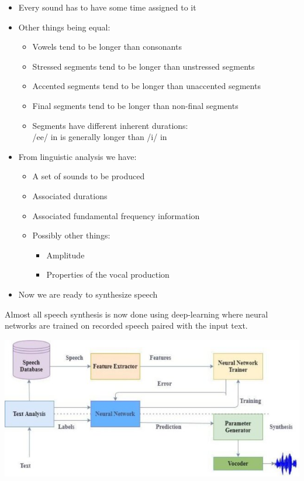 \documentclass[a4paper,landscape,headrule,footrule,xetex]{foils}
\begin{document}
\begin{itemize}
\item Every sound has to have some time assigned to it
\item Other things being equal:
  \begin{itemize}
  \item Vowels tend to be longer than consonants
  \item Stressed segments tend to be longer than unstressed segments
  \item Accented segments tend to be longer than unaccented segments
  \item Final segments tend to be longer than non-final segments
  \item Segments have different inherent durations: 
    \\ /ee/ in  is generally longer than /i/ in 
    \end{itemize}
  \end{itemize}
  \begin{itemize}
  \item From linguistic analysis we have:
    \begin{itemize}
    \item A set of sounds to be produced
    \item   Associated durations
    \item   Associated fundamental frequency information
    \item   Possibly other things:
          \begin{itemize}
            \item Amplitude
           \item  Properties of the vocal production
          \end{itemize}
        \end{itemize}
      \item Now we are ready to synthesize speech
  \end{itemize}




Almost all speech synthesis is now done using deep-learning where 
neural networks are trained on recorded speech paired with the input text.  

\bigskip

\noindent\includegraphics[height=0.7\textheight]{../pics/Illustration-of-Deep-Neural-Network-DNN-in-speech-synthesis-system_W640.jpg}
\end{document}
